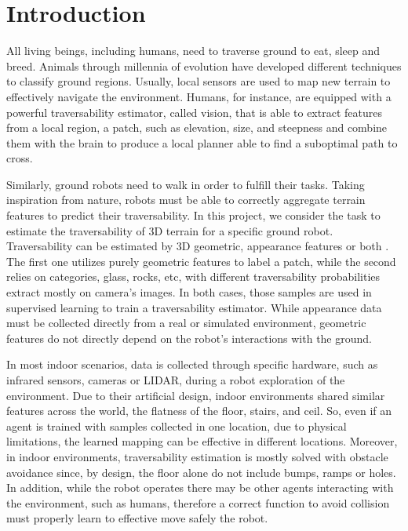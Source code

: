 \documentclass[../document.tex]{subfiles}
\begin{document}
\chapter{Introduction}

All living beings, including humans, need to traverse ground to eat, sleep and breed. Animals through millennia of evolution have developed different techniques to classify ground regions. Usually, local sensors are used to map new terrain to effectively navigate the environment. Humans, for instance, are equipped with a powerful traversability estimator, called vision, that is able to extract features from a local region, a patch, such as elevation, size, and steepness and combine them with the brain to produce a local planner able to find a suboptimal path to cross.

Similarly, ground robots need to walk in order to fulfill their tasks. Taking inspiration from nature, robots must be able to correctly aggregate terrain features to predict their traversability. In this project, we consider the task to estimate the traversability of 3D terrain for a specific ground robot. Traversability can be estimated by 3D geometric, appearance features or both \cite{papadakis}. The first one utilizes purely geometric features to label a patch, while the second relies on categories, glass, rocks, etc, with different traversability probabilities extract mostly on camera's images. In both cases, those samples are used in supervised learning to train a traversability estimator. While appearance data must be collected directly from a real or simulated environment, geometric features do not directly depend on the robot's interactions with the ground. 

In most indoor scenarios, data is collected through specific hardware, such as infrared sensors, cameras or LIDAR, during a robot exploration of the environment. Due to their artificial design, indoor environments shared similar features across the world, the flatness of the floor, stairs, and ceil. So, even if an agent is trained with samples collected in one location, due to physical limitations, the learned mapping can be effective in different locations. Moreover, in indoor environments, traversability estimation is mostly solved with obstacle avoidance since, by design, the floor alone do not include bumps, ramps or holes. In addition, while the robot operates there may be other agents interacting with the environment, such as humans, therefore a correct function to avoid collision must properly learn to effective move safely the robot.
\end{document}
